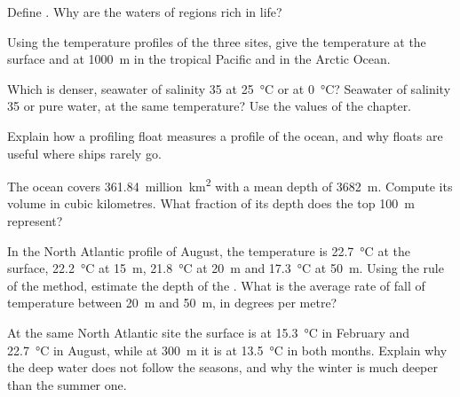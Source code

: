 \begin{exercise}[$\star$]\label{exo:g10:layered-ocean:2}
Define . Why are the waters of  regions rich in life?
\end{exercise}

\begin{exercise}[$\star$]\label{exo:g10:layered-ocean:3}
Using the temperature profiles of the three sites, give the temperature at
the surface and at \qty{1000}{m} in the tropical Pacific and in the Arctic
Ocean.
\end{exercise}

\begin{exercise}[$\star$]\label{exo:g10:layered-ocean:4}
Which is denser, seawater of salinity 35 at \qty{25}{\degreeCelsius} or at
\qty{0}{\degreeCelsius}? Seawater of salinity 35 or pure water, at the same
temperature? Use the values of the chapter.
\end{exercise}

\begin{exercise}[$\star$]\label{exo:g10:layered-ocean:5}
Explain how a profiling float measures a profile of the ocean, and why
floats are useful where ships rarely go.
\end{exercise}

\begin{exercise}[$\star\star$]\label{exo:g10:layered-ocean:6}
The ocean covers \num{361.84}~million~\unit{km^2} with a mean depth of
\qty{3682}{m}. Compute its volume in cubic kilometres. What fraction of its
depth does the top \qty{100}{m} represent?
\end{exercise}

\begin{exercise}[$\star\star$]\label{exo:g10:layered-ocean:7}
In the North Atlantic profile of August, the temperature is
\qty{22.7}{\degreeCelsius} at the surface, \qty{22.2}{\degreeCelsius} at
\qty{15}{m}, \qty{21.8}{\degreeCelsius} at \qty{20}{m} and
\qty{17.3}{\degreeCelsius} at \qty{50}{m}. Using the rule of the method,
estimate the depth of the . What is the average rate of fall of
temperature between \qty{20}{m} and \qty{50}{m}, in degrees per metre?
\end{exercise}

\begin{exercise}[$\star\star$]\label{exo:g10:layered-ocean:8}
At the same North Atlantic site the surface is at \qty{15.3}{\degreeCelsius}
in February and \qty{22.7}{\degreeCelsius} in August, while at \qty{300}{m}
it is at \qty{13.5}{\degreeCelsius} in both months. Explain why the deep
water does not follow the seasons, and why the winter  is much
deeper than the summer one.
\end{exercise}

